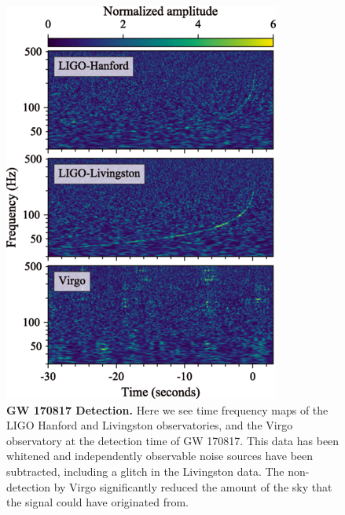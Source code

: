 \documentclass[11pt]{cuthesis}
\begin{document}
\begin{figure} %
\begin{center}
\includegraphics[width=0.8\linewidth]{gw170817_ifo_strain.png}
\end{center}
\caption{\textbf{GW 170817 Detection.} Here we see time frequency maps of the LIGO Hanford and Livingston observatories, and the Virgo observatory at the detection time of GW 170817. This data has been whitened and independently observable noise sources have been subtracted, including a glitch in the Livingston data. The non-detection by Virgo significantly reduced the amount of the sky that the signal could have originated from.\cite{GW170817_det}}
\label{fig:170817 ifo strain}
\end{figure}
\end{document}
